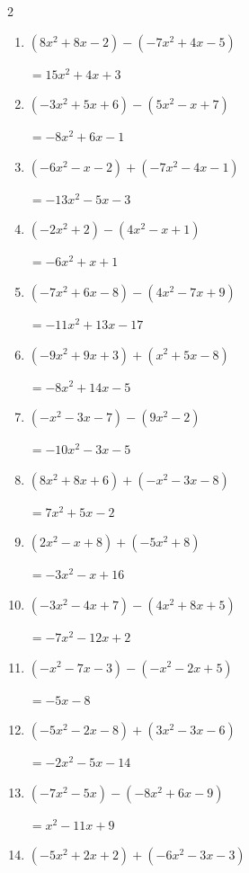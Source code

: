 \begin{multicols}{2}
\begin{enumerate}
        $=-7x^{2}+8x-6$

  \item $(8x^{2}+8x-2)-(-7x^{2}+4x-5)$

        $=15x^{2}+4x+3$

  \item $(-3x^{2}+5x+6)-(5x^{2}-x+7)$

        $=-8x^{2}+6x-1$

  \item $(-6x^{2}-x-2)+(-7x^{2}-4x-1)$

        $=-13x^{2}-5x-3$

  \item $(-2x^{2}+2)-(4x^{2}-x+1)$

        $=-6x^{2}+x+1$

  \item $(-7x^{2}+6x-8)-(4x^{2}-7x+9)$

        $=-11x^{2}+13x-17$

  \item $(-9x^{2}+9x+3)+(x^{2}+5x-8)$

        $=-8x^{2}+14x-5$

  \item $(-x^{2}-3x-7)-(9x^{2}-2)$

        $=-10x^{2}-3x-5$

  \item $(8x^{2}+8x+6)+(-x^{2}-3x-8)$

        $=7x^{2}+5x-2$

  \item $(2x^{2}-x+8)+(-5x^{2}+8)$

        $=-3x^{2}-x+16$

  \item $(-3x^{2}-4x+7)-(4x^{2}+8x+5)$

        $=-7x^{2}-12x+2$

  \item $(-x^{2}-7x-3)-(-x^{2}-2x+5)$

        $=-5x-8$

\columnbreak %

  \item $(-5x^{2}-2x-8)+(3x^{2}-3x-6)$

        $=-2x^{2}-5x-14$

  \item $(-7x^{2}-5x)-(-8x^{2}+6x-9)$

        $=x^{2}-11x+9$

  \item $(-5x^{2}+2x+2)+(-6x^{2}-3x-3)$


\end{enumerate}
\end{multicols}
